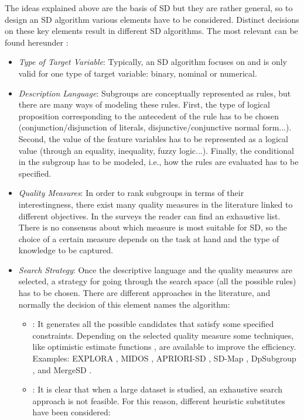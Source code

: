 The ideas explained above are the basis of SD but they are rather general, so to design an SD algorithm various elements have to be considered. Distinct decisions on these key elements result in different SD algorithms. The most relevant can be found hereunder \cite{Herrera2011}: 
\begin{itemize}
	\item \textit{Type of Target Variable}: Typically, an SD algorithm focuses on and is only valid for one type of target variable: binary, nominal or numerical.
	\item \textit{Description Language}: Subgroups are conceptually represented as rules, but there are many ways of modeling these rules. First, the type of logical proposition corresponding to the antecedent of the rule has to be chosen (conjunction/disjunction of literals, disjunctive/conjunctive normal form...). Second, the value of the feature variables has to be represented as a logical value (through an equality, inequality, fuzzy logic...). Finally, the conditional in the subgroup has to be modeled, i.e., how the rules are evaluated has to be specified.
	\item \textit{Quality Measures}: In order to rank subgroups in terms of their interestingness, there exist many quality measures in the literature linked to different objectives. In the surveys \cite{Herrera2011,Atzmueller2015,Helal2016} the reader can find an exhaustive list. There is no consensus about which measure is most suitable for SD, so the choice of a certain measure depends on the task at hand and the type of knowledge to be captured. 
	\item  \textit{Search Strategy}: Once the descriptive language and the quality measures are selected, a strategy for going through the search space (all the possible rules) has to be chosen. There are different approaches in the literature, and normally the decision of this element names the algorithm:
	\begin{itemize}
		\item \underline{}: It generates all the possible candidates that satisfy some specified constraints. Depending on the selected quality measure some techniques, like optimistic estimate functions \cite{Grosskreutz2008}, are available to improve the efficiency. Examples: EXPLORA \cite{Klosgen1996}, MIDOS \cite{Wrobel1997}, APRIORI-SD \cite{Kavsek2003}, SD-Map \cite{Atzmueller2006}, DpSubgroup \cite{Grosskreutz2008}, and MergeSD \cite{Grosskreutz2009}.
		\item \underline{}: It is clear that when a large dataset is studied, an exhaustive search approach is not feasible. For this reason, different heuristic substitutes have been considered:

\end{itemize}
\end{itemize}
